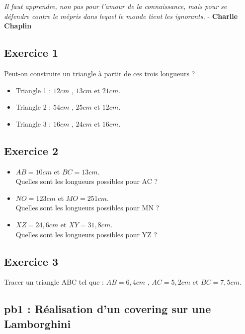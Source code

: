 



\begin{center}
  \textit{Il faut apprendre, non pas pour l'amour de la connaissance, mais pour se défendre contre le mépris dans lequel le monde tient les ignorants.} - \textbf{Charlie Chaplin}
\end{center}

\begin{multicols}{2} 
\subsection*{Exercice 1} 

Peut-on construire un triangle à partir de ces trois longueurs ? 

\begin{itemize}[label={$\bullet$}]
  \item Triangle 1 : $12cm$ , $13cm$  et $21cm$.
  \item Triangle 2 : $54cm$ , $25cm$ et $12cm$.
  \item Triangle 3 : $16cm$ , $24cm$ et $16cm$.
\end{itemize} \columnbreak

\subsection*{Exercice 2} 

\begin{itemize}[label={$\bullet$}]
  \item $AB = 10cm$ et $BC = 13cm$. \\ Quelles sont les longueurs possibles pour AC ?
  \item $NO = 123cm$ et $MO = 251cm$. \\ Quelles sont les longueurs possibles pour MN ?
  \item $XZ = 24,6cm$ et $XY = 31,8cm$. \\ Quelles sont les longueurs possibles pour YZ ?
\end{itemize}
\end{multicols}

\subsection*{Exercice 3} 

Tracer un triangle ABC tel que : $AB = 6,4cm$ , $AC = 5,2cm$ et $BC = 7,5cm$. 

\subsection*{pb1 : Réalisation d'un covering sur une Lamborghini} 

